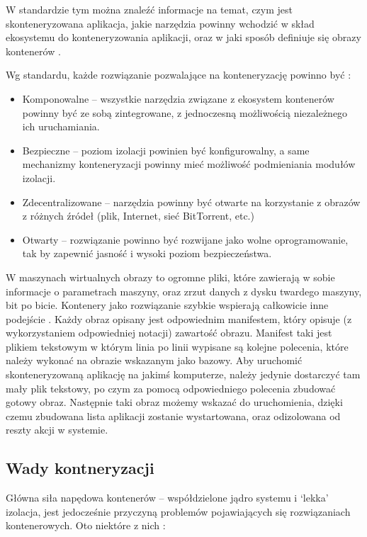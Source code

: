\documentclass[10pt,a4paper,titlepage,twoside]{report}
\begin{document}
\indent \indent W standardzie tym można znaleźć informacje na temat, czym jest skonteneryzowana aplikacja, jakie narzędzia powinny wchodzić w skład ekosystemu do konteneryzowania aplikacji, oraz w jaki sposób definiuje się obrazy kontenerów \cite{ad23}.

\indent \indent Wg standardu, każde rozwiązanie pozwalające na konteneryzację powinno być \cite{ad23}:
\begin{itemize}
	\item Komponowalne – wszystkie narzędzia związane z ekosystem kontenerów powinny być ze sobą zintegrowane, z jednoczesną możliwością niezależnego ich uruchamiania.
	\item Bezpieczne – poziom izolacji powinien być konfigurowalny, a same mechanizmy konteneryzacji powinny mieć możliwość podmieniania modułów izolacji.
	\item Zdecentralizowane – narzędzia powinny być otwarte na korzystanie z obrazów z różnych źródeł (plik, Internet, sieć BitTorrent, etc.)
	\item Otwarty – rozwiązanie powinno być rozwijane jako wolne oprogramowanie, tak by zapewnić jasność i wysoki poziom bezpieczeństwa.
\end{itemize}

W maszynach wirtualnych obrazy to ogromne pliki, które zawierają w sobie informacje o parametrach maszyny, oraz zrzut danych z dysku twardego maszyny, bit po bicie. Kontenery jako rozwiązanie szybkie wspierają całkowicie inne podejście \cite{ad24}. Każdy obraz opisany jest odpowiednim manifestem, który opisuje (z wykorzystaniem odpowiedniej notacji) zawartość obrazu. Manifest taki jest plikiem tekstowym w którym linia po linii wypisane są kolejne polecenia, które należy wykonać na obrazie wskazanym jako bazowy. Aby uruchomić skonteneryzowaną aplikację na jakimś komputerze, należy jedynie dostarczyć tam mały plik tekstowy, po czym za pomocą odpowiedniego polecenia zbudować gotowy obraz. Następnie taki obraz możemy wskazać do uruchomienia, dzięki czemu zbudowana lista aplikacji zostanie wystartowana, oraz odizolowana od reszty akcji w systemie.

\subsection{Wady kontneryzacji}\indent \indent Główna siła napędowa kontenerów – współdzielone jądro systemu i ‘lekka’ izolacja, jest jedocześnie przyczyną problemów pojawiających się rozwiązaniach kontenerowych. Oto niektóre z nich \cite{25}:
\end{document}
